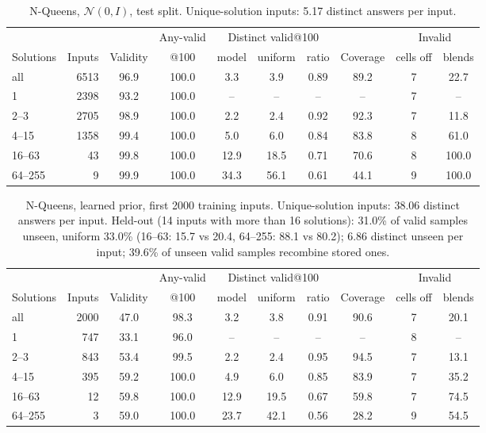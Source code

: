 \documentclass[11pt]{article}
\begin{document}
\begin{table}[H]
\centering\small
\begin{tabular}{@{}lrcccccccc@{}}
\toprule
& & & Any-valid & \multicolumn{3}{c}{Distinct valid@100} & & \multicolumn{2}{c}{Invalid} \\
\cmidrule(lr){5-7}\cmidrule(l){9-10}
Solutions & Inputs & Validity & @100 & model & uniform & ratio & Coverage & cells off & blends \\
\midrule
all & 6513 & 96.9 & 100.0 & 3.3 & 3.9 & 0.89 & 89.2 & 7 & 22.7 \\
1 & 2398 & 93.2 & 100.0 & -- & -- & -- & -- & 7 & -- \\
2--3 & 2705 & 98.9 & 100.0 & 2.2 & 2.4 & 0.92 & 92.3 & 7 & 11.8 \\
4--15 & 1358 & 99.4 & 100.0 & 5.0 & 6.0 & 0.84 & 83.8 & 8 & 61.0 \\
16--63 & 43 & 99.8 & 100.0 & 12.9 & 18.5 & 0.71 & 70.6 & 8 & 100.0 \\
64--255 & 9 & 99.9 & 100.0 & 34.3 & 56.1 & 0.61 & 44.1 & 9 & 100.0 \\
\bottomrule
\end{tabular}
\caption{N-Queens, $\mathcal{N}(0,I)$, test split. Unique-solution inputs: 5.17 distinct answers per input.}
\end{table}

\begin{table}[H]
\centering\small
\begin{tabular}{@{}lrcccccccc@{}}
\toprule
& & & Any-valid & \multicolumn{3}{c}{Distinct valid@100} & & \multicolumn{2}{c}{Invalid} \\
\cmidrule(lr){5-7}\cmidrule(l){9-10}
Solutions & Inputs & Validity & @100 & model & uniform & ratio & Coverage & cells off & blends \\
\midrule
all & 2000 & 47.0 & 98.3 & 3.2 & 3.8 & 0.91 & 90.6 & 7 & 20.1 \\
1 & 747 & 33.1 & 96.0 & -- & -- & -- & -- & 8 & -- \\
2--3 & 843 & 53.4 & 99.5 & 2.2 & 2.4 & 0.95 & 94.5 & 7 & 13.1 \\
4--15 & 395 & 59.2 & 100.0 & 4.9 & 6.0 & 0.85 & 83.9 & 7 & 35.2 \\
16--63 & 12 & 59.8 & 100.0 & 12.9 & 19.5 & 0.67 & 59.8 & 7 & 74.5 \\
64--255 & 3 & 59.0 & 100.0 & 23.7 & 42.1 & 0.56 & 28.2 & 9 & 54.5 \\
\bottomrule
\end{tabular}
\caption{N-Queens, learned prior, first 2000 training inputs. Unique-solution inputs: 38.06 distinct answers per input. Held-out (14 inputs with more than 16 solutions): 31.0\% of valid samples unseen, uniform 33.0\% (16--63: 15.7 vs 20.4, 64--255: 88.1 vs 80.2); 6.86 distinct unseen per input; 39.6\% of unseen valid samples recombine stored ones.}
\end{table}
\end{document}
